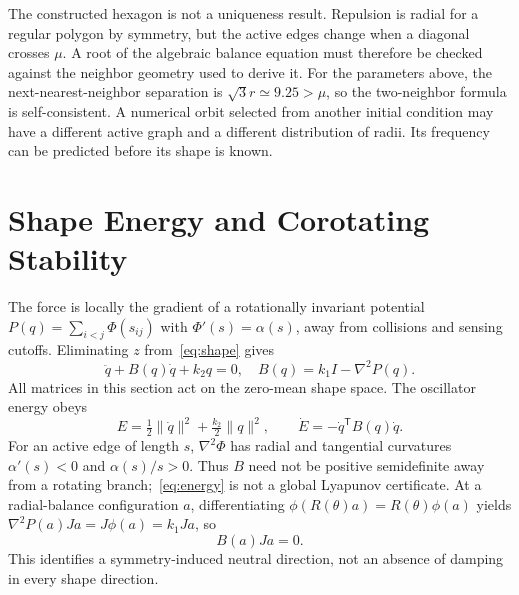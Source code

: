 \documentclass[conference]{IEEEtran}
\newcommand{\norm}[1]{\lVert#1\rVert}
\begin{document}
The constructed hexagon is not a uniqueness result. Repulsion is radial for a regular polygon by symmetry, but the active edges change when a diagonal crosses $\mu$. A root of the algebraic balance equation must therefore be checked against the neighbor geometry used to derive it. For the parameters above, the next-nearest-neighbor separation is $\sqrt3r\simeq9.25>\mu$, so the two-neighbor formula is self-consistent. A numerical orbit selected from another initial condition may have a different active graph and a different distribution of radii. Its frequency can be predicted before its shape is known.

\section{Shape Energy and Corotating Stability}
\label{sec:stability}
The force is locally the gradient of a rotationally invariant potential $P(q)=\sum_{i<j}\Phi(s_{ij})$ with $\Phi'(s)=\alpha(s)$, away from collisions and sensing cutoffs. Eliminating $z$ from~\eqref{eq:shape} gives
\begin{equation}
 \ddot q+B(q)\dot q+k_2q=0,
 \quad B(q)=k_1I-\nabla^2P(q).
 \label{eq:secondorder}
\end{equation}
All matrices in this section act on the zero-mean shape space. The oscillator energy obeys
\begin{equation}
 E=\tfrac12\norm{\dot q}^2+\tfrac{k_2}{2}\norm q^2,
 \qquad \dot E=-\dot q^{\mathsf T}B(q)\dot q.
 \label{eq:energy}
\end{equation}
For an active edge of length $s$, $\nabla^2\Phi$ has radial and tangential curvatures $\alpha'(s)<0$ and $\alpha(s)/s>0$. Thus $B$ need not be positive semidefinite away from a rotating branch;~\eqref{eq:energy} is not a global Lyapunov certificate. At a radial-balance configuration $a$, differentiating $\phi(R(\theta)a)=R(\theta)\phi(a)$ yields $\nabla^2P(a)Ja=J\phi(a)=k_1Ja$, so
\begin{equation}
 B(a)Ja=0.\label{eq:shapezero}
\end{equation}
This identifies a symmetry-induced neutral direction, not an absence of damping in every shape direction.
\end{document}
